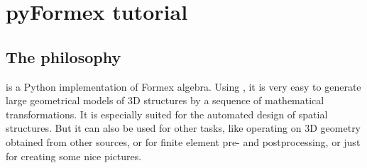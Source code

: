 
\chapter{pyFormex tutorial}
\label{cha:tutorial}


\section{The \pyf philosophy}
\label{sec:intro-tut}

\pyformex is a Python implementation of Formex algebra. Using \pyformex, it is very easy to generate large geometrical models of 3D structures by a sequence of mathematical transformations. It is especially suited for the automated design of spatial structures. But it can also be used for other tasks, like operating on 3D geometry obtained from other sources, or for finite element pre- and postprocessing, or just for creating some nice pictures.

